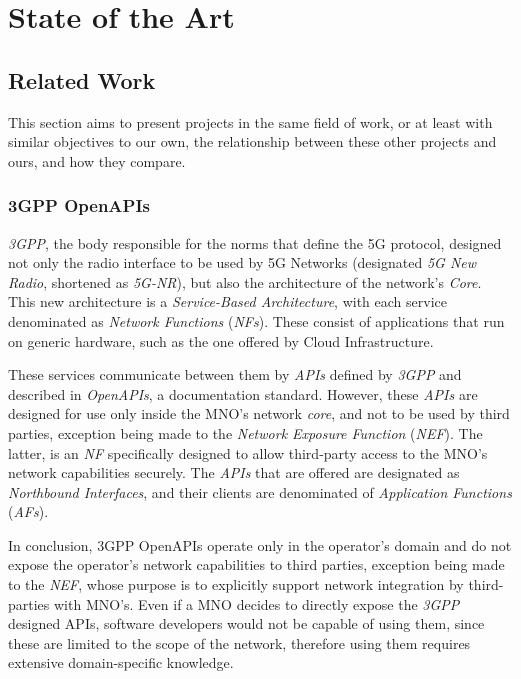 \chapter{State of the Art}

\section{Related Work}

This section aims to present projects in the same field of work,
or at least with similar objectives to our own, the relationship
between these other projects and ours, and how they compare.

\subsection{3GPP OpenAPIs}\label{sec:related_work_3gpp}

\emph{3GPP}, the body responsible for the norms that define the
5G protocol, designed not only the radio interface to be used by
5G Networks (designated \emph{5G New Radio}, shortened as
\emph{5G-NR}), but also the architecture of the network's
\emph{Core}. This new architecture is a \emph{Service-Based
Architecture}, with each service denominated as \emph{Network
Functions} (\emph{NFs}). These consist of applications that run
on generic hardware, such as the one offered by Cloud
Infrastructure.

These services communicate between them by \emph{APIs} defined by
\emph{3GPP} and described in \emph{OpenAPIs}, a documentation
standard. However, these \emph{APIs} are designed for use only
inside the MNO's network \emph{core}, and not to be used by third
parties, exception being made to the \emph{Network Exposure
Function} (\emph{NEF}). The latter, is an \emph{NF} specifically
designed to allow third-party access to the MNO's network
capabilities securely. The \emph{APIs} that are offered are
designated as \emph{Northbound Interfaces}, and their clients are
denominated of \emph{Application Functions} (\emph{AFs}).

In conclusion, 3GPP OpenAPIs operate only in the operator's
domain and do not expose the operator's network capabilities to
third parties, exception being made to the \emph{NEF}, whose
purpose is to explicitly support network integration by
third-parties with MNO's. Even if a MNO decides to directly
expose the \emph{3GPP} designed APIs, software developers would
not be capable of using them, since these are limited to the
scope of the network, therefore using them requires extensive
domain-specific knowledge.


